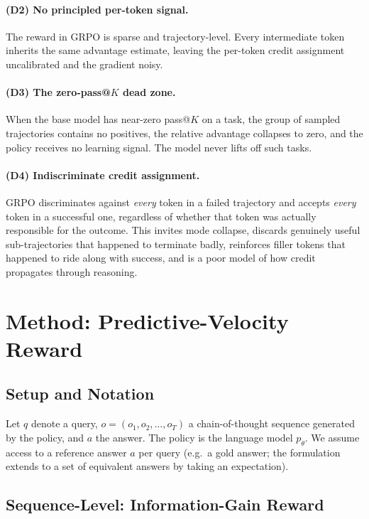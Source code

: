 \documentclass{article}
\begin{document}
\paragraph{(D2) No principled per-token signal.}
The reward in GRPO is sparse and trajectory-level. Every intermediate token
inherits the same advantage estimate, leaving the per-token credit assignment
uncalibrated and the gradient noisy.

\paragraph{(D3) The zero-pass@\(K\) dead zone.}
When the base model has near-zero pass@\(K\) on a task, the group of sampled
trajectories contains no positives, the relative advantage collapses to zero,
and the policy receives no learning signal. The model never lifts off such
tasks.

\paragraph{(D4) Indiscriminate credit assignment.}
GRPO discriminates against \emph{every} token in a failed trajectory and
accepts \emph{every} token in a successful one, regardless of whether that
token was actually responsible for the outcome. This invites mode collapse,
discards genuinely useful sub-trajectories that happened to terminate badly,
reinforces filler tokens that happened to ride along with success, and is a
poor model of how credit propagates through reasoning.

\section{Method: Predictive-Velocity Reward}
\label{sec:method}

\subsection{Setup and Notation}

Let \(q\) denote a query, \(o = (o_1, o_2, \dots, o_T)\) a chain-of-thought
sequence generated by the policy, and \(a\) the answer. The policy is the
language model \(p_\theta\). We assume access to a reference answer \(a\) per
query (e.g.\ a gold answer; the formulation extends to a set of equivalent
answers by taking an expectation).

\subsection{Sequence-Level: Information-Gain Reward}
\end{document}
